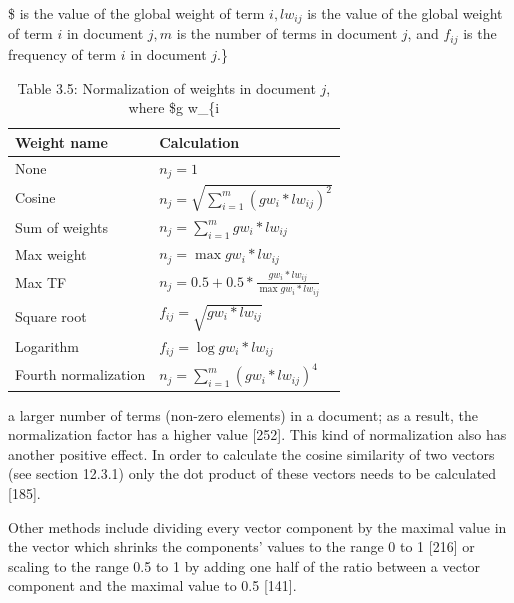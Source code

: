 \documentclass[10pt]{book}
\begin{document}
\begin{table}[h]
\begin{center}
\captionsetup{labelformat=empty}
\caption{Table 3.5: Normalization of weights in document $j$, where \$g w\_\{i}\$ is the value of the global weight of term $i, l w_{i j}$ is the value of the global weight of term $i$ in document $j, m$ is the number of terms in document $j$, and $f_{i j}$ is the frequency of term $i$ in document $j$.\}\\
\begin{tabular}{|l|l|}
\hline
Weight name & Calculation \\
\hline
None & $n_{j}=1$ \\
\hline
Cosine & $n_{j}=\sqrt{\sum_{i=1}^{m}\left(g w_{i} * l w_{i j}\right)^{2}}$ \\
\hline
Sum of weights & $n_{j}=\sum_{i=1}^{m} g w_{i} * l w_{i j}$ \\
\hline
Max weight & $n_{j}=\max g w_{i} * l w_{i j}$ \\
\hline
Max TF & $n_{j}=0.5+0.5 * \frac{g w_{i} * l w_{i j}}{\max g w_{i} * l w_{i j}}$ \\
\hline
Square root & $f_{i j}=\sqrt{g w_{i} * l w_{i j}}$ \\
\hline
Logarithm & $f_{i j}=\log g w_{i} * l w_{i j}$ \\
\hline
Fourth normalization & $n_{j}=\sum_{i=1}^{m}\left(g w_{i} * l w_{i j}\right)^{4}$ \\
\hline
\end{tabular}
\end{center}
\end{table}

a larger number of terms (non-zero elements) in a document; as a result, the normalization factor has a higher value [252]. This kind of normalization also has another positive effect. In order to calculate the cosine similarity of two vectors\\[0pt]
(see section 12.3.1) only the dot product of these vectors needs to be calculated [185].

Other methods include dividing every vector component by the maximal value in the vector which shrinks the components' values to the range 0 to 1 [216] or scaling to the range 0.5 to 1 by adding one half of the ratio between a vector component and the maximal value to 0.5 [141].
\end{document}

